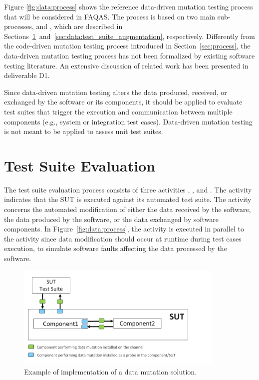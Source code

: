 Figure \ref{fig:data:process} shows the reference data-driven mutation testing process that will be considered in FAQAS. The process is based on two main sub-processes,  and , which are described in Sections~\ref{sec:data:test_suite_evaluation}~and~\ref{sec:data:test_suite_augmentation}, respectively. Differently from the code-driven mutation testing process introduced in Section~\ref{sec:process}, the data-driven mutation testing process has not been formalized by existing software testing literature. An extensive discussion of related work has been presented in deliverable D1.

Since data-driven mutation testing alters the data produced, received, or exchanged by the software or its components, it should be applied to evaluate test suites that trigger the execution and communication between multiple components (e.g., system or integration test cases). Data-driven mutation testing is not meant to be applied to assess unit test suites.

\clearpage
\section{Test Suite Evaluation} %
\label{sec:data:test_suite_evaluation}

The test suite evaluation process consists of three activities , ,  and .
The activity  indicates that the SUT is executed against its automated test suite. 
The activity  concerns the automated modification of either the data received by the software, the data produced by the software, or the data exchanged by software components.
In Figure~\ref{fig:data:process}, the activity  is executed in parallel to the activity  since data modification should occur at runtime during test cases execution, to simulate software faults affecting the data processed by the software.




\begin{figure}
	\centering
		\includegraphics[width=10cm]{images/dataMutationExample}
		\caption{Example of implementation of a data mutation solution.}
		\label{fig:data:mutateData}
	\end{figure}
	
